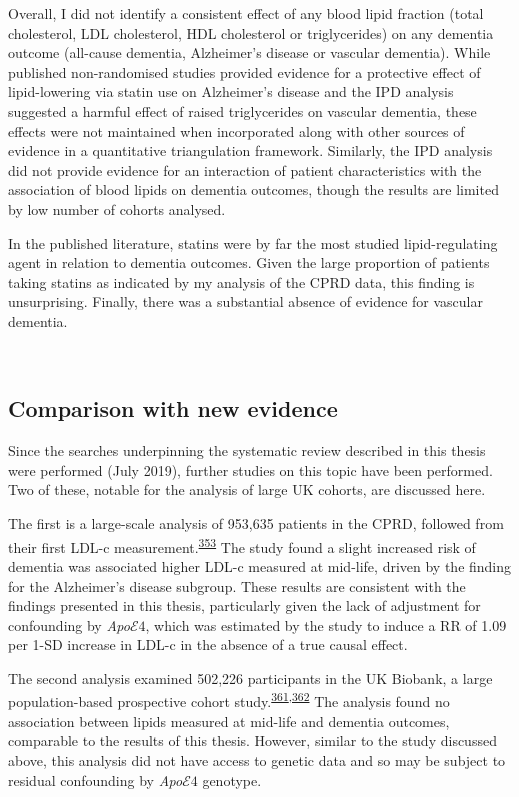 \documentclass[a4paper, twoside]{templates/ociamthesis}
\begin{document}
Overall, I did not identify a consistent effect of any blood lipid fraction (total cholesterol, LDL cholesterol, HDL cholesterol or triglycerides) on any dementia outcome (all-cause dementia, Alzheimer's disease or vascular dementia). While published non-randomised studies provided evidence for a protective effect of lipid-lowering via statin use on Alzheimer's disease and the IPD analysis suggested a harmful effect of raised triglycerides on vascular dementia, these effects were not maintained when incorporated along with other sources of evidence in a quantitative triangulation framework. Similarly, the IPD analysis did not provide evidence for an interaction of patient characteristics with the association of blood lipids on dementia outcomes, though the results are limited by low number of cohorts analysed.

In the published literature, statins were by far the most studied lipid-regulating agent in relation to dementia outcomes. Given the large proportion of patients taking statins as indicated by my analysis of the CPRD data, this finding is unsurprising. Finally, there was a substantial absence of evidence for vascular dementia.

~

\hypertarget{comparison-with-new-evidence}{%
\subsection{Comparison with new evidence}\label{comparison-with-new-evidence}}

Since the searches underpinning the systematic review described in this thesis were performed (July 2019), further studies on this topic have been performed. Two of these, notable for the analysis of large UK cohorts, are discussed here.

The first is a large-scale analysis of 953,635 patients in the CPRD, followed from their first LDL-c measurement.\textsuperscript{\protect\hyperlink{ref-iwagami2021}{353}} The study found a slight increased risk of dementia was associated higher LDL-c measured at mid-life, driven by the finding for the Alzheimer's disease subgroup. These results are consistent with the findings presented in this thesis, particularly given the lack of adjustment for confounding by \emph{Apo}\(\mathcal{E}4\), which was estimated by the study to induce a RR of 1.09 per 1-SD increase in LDL-c in the absence of a true causal effect.

The second analysis examined 502,226 participants in the UK Biobank, a large population-based prospective cohort study.\textsuperscript{\protect\hyperlink{ref-gong2021}{361},\protect\hyperlink{ref-sudlow2015}{362}} The analysis found no association between lipids measured at mid-life and dementia outcomes, comparable to the results of this thesis. However, similar to the study discussed above, this analysis did not have access to genetic data and so may be subject to residual confounding by \emph{Apo}\(\mathcal{E}4\) genotype.
\end{document}
